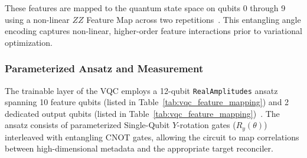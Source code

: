 \documentclass[journal]{IEEEtran}
\begin{document}
These features are mapped to the quantum state space on qubits 0 through 9 using a non-linear $ZZ$ Feature Map across two repetitions~\cite{Havlicek_2019}. This entangling angle encoding captures non-linear, higher-order feature interactions prior to variational optimization.

\subsubsection{Parameterized Ansatz and Measurement}
The trainable layer of the VQC employs a 12-qubit \texttt{RealAmplitudes} ansatz spanning 10 feature qubits (listed in Table~\ref{tab:vqc_feature_mapping}) and 2 dedicated output qubits (listed in Table~\ref{tab:vqc_feature_mapping})~\cite{Kandala_2017}. The ansatz consists of parameterized Single-Qubit $Y$-rotation gates ($R_y(\theta)$) interleaved with entangling CNOT gates, allowing the circuit to map correlations between high-dimensional metadata and the appropriate target reconciler.
\end{document}
